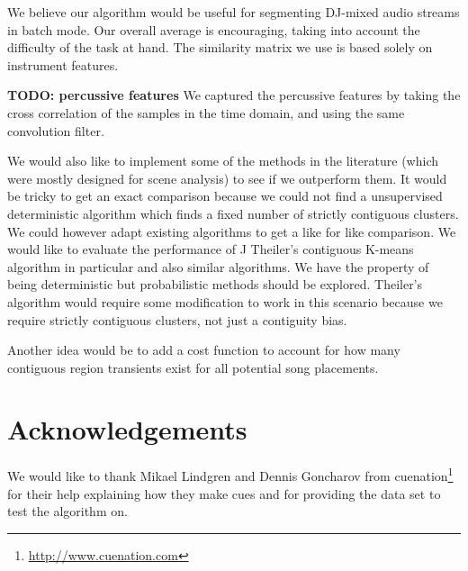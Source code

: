 \documentclass[twocolumn]{article}
\begin{document}
We believe our algorithm would be useful for segmenting DJ-mixed audio streams in batch mode. Our overall average is encouraging, taking into account the difficulty of the task at hand. The similarity matrix we use is based solely on instrument features. 

\textbf{TODO: percussive features}
We captured the percussive features by taking the cross correlation of the samples in the time domain, and using the same convolution filter. 


 We would also like to implement some of the methods in the literature (which were mostly designed for scene analysis) to see if we outperform them. It would be tricky to get an exact comparison because we could not find a unsupervised deterministic algorithm which finds a fixed number of strictly contiguous clusters. We could however adapt existing algorithms to get a like for like comparison. We would like to evaluate the performance of J Theiler's contiguous K-means algorithm in particular \cite{theiler1997contiguity} and also similar algorithms. We have the property of being deterministic but probabilistic methods should be explored. Theiler's algorithm would require some modification to work in this scenario because we require strictly contiguous clusters, not just a contiguity bias. 

Another idea would be to add a cost function to account for how many contiguous region transients exist for all potential song placements. 

\section{Acknowledgements}

We would like to thank Mikael Lindgren and Dennis Goncharov from cuenation\footnote{\url{http://www.cuenation.com}} for their help explaining how they make cues and for providing the data set to test the algorithm on.




\end{document}
